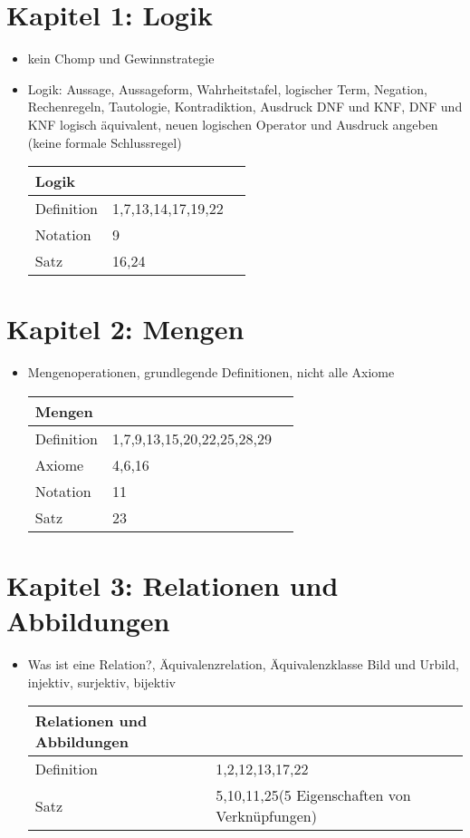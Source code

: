 \documentclass[11pt,a4paper]{article}
\begin{document}
\section*{Kapitel 1: Logik}
\begin{itemize}
	\item kein Chomp und Gewinnstrategie
	\item Logik: Aussage, Aussageform, Wahrheitstafel, logischer Term, Negation, Rechenregeln, Tautologie, Kontradiktion,   Ausdruck DNF und KNF, DNF und KNF logisch äquivalent, neuen logischen Operator und Ausdruck angeben (keine formale Schlussregel)
	\begin{center}
		\begin{tabular}{ | l | l | l | }
			\hline
			Logik& \\ \hline	\hline	
			Definition&1,7,13,14,17,19,22 \\ \hline
			Notation&9 \\ \hline
			Satz&16,24\\
			\hline	
		\end{tabular}
	\end{center}
\end{itemize}
	
\section*{Kapitel 2: Mengen}
\begin{itemize}
	\item Mengenoperationen, grundlegende Definitionen, nicht alle Axiome
	\begin{center}
		\begin{tabular}{ | l | l | l | }
			\hline
			Mengen& \\ \hline	\hline	
			Definition&1,7,9,13,15,20,22,25,28,29 \\ \hline
			Axiome&4,6,16 \\ \hline
			Notation&11 \\ \hline
			Satz&23\\ 
			\hline	
		\end{tabular}
	\end{center}	
\end{itemize}

\section*{Kapitel 3: Relationen und Abbildungen}
\begin{itemize}
	\item Was ist eine Relation?, Äquivalenzrelation, Äquivalenzklasse Bild und Urbild, injektiv, surjektiv, bijektiv
	\begin{center}
		\begin{tabular}{ | l | l | l | }
			\hline
			Relationen und Abbildungen& \\ \hline	\hline	
			Definition&1,2,12,13,17,22 \\ \hline
			Satz&5,10,11,25(5 Eigenschaften von Verknüpfungen)\\ 
			\hline	
		\end{tabular}
	\end{center}	
\end{itemize}
\end{document}

